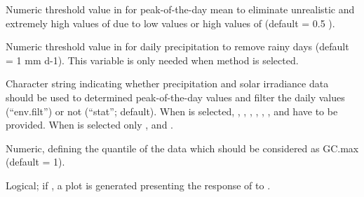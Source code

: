 \documentclass[a4paper]{book}
\begin{document}
\begin{Arguments}
\begin{ldescription}
\item[\code{vpd.cutoff}] Numeric threshold value in  for peak-of-the-day mean  to eliminate unrealistic
and extremely high values of  due to low  values or high values of  (default = 0.5 ).

\item[\code{prec.lim}] Numeric threshold value in   for daily precipitation to remove rainy days (default = 1 mm d-1).
This variable is only needed when  method is selected.

\item[\code{method}] Character string indicating whether precipitation and solar irradiance data should be used
to determined peak-of-the-day  values and filter the daily  values (“env.filt”)
or not (“stat”; default). When  is selected, , , , ,
, ,  and  have to be provided.
When  is selected only ,  and .

\item[\code{max.quant}] Numeric, defining the quantile of the  data which should be considered as GC.max (default = 1).

\item[\code{make.plot}] Logical; if , a plot is generated presenting the response of  to .
\end{ldescription}
\end{Arguments}
%
\end{document}
